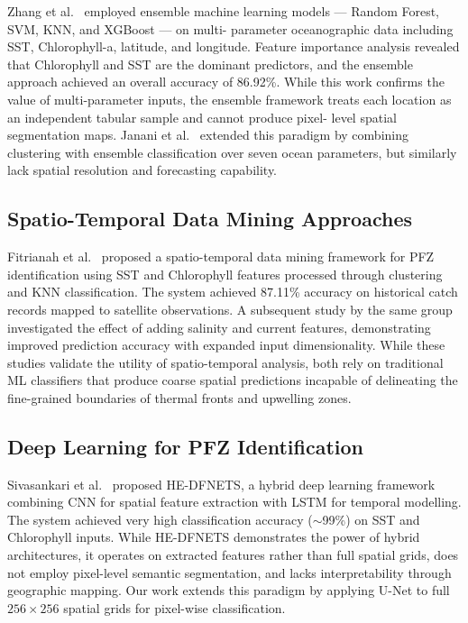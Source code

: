 \documentclass[conference]{IEEEtran}
\begin{document}
Zhang et al.\ \cite{zhang_ensemble2023} employed ensemble machine
learning models --- Random Forest, SVM, KNN, and XGBoost --- on multi-
parameter oceanographic data including SST, Chlorophyll-a, latitude,
and longitude. Feature importance analysis revealed that Chlorophyll
and SST are the dominant predictors, and the ensemble approach
achieved an overall accuracy of 86.92\%. While this work confirms the
value of multi-parameter inputs, the ensemble framework treats each
location as an independent tabular sample and cannot produce pixel-
level spatial segmentation maps. Janani et al.\ \cite{janani2025}
extended this paradigm by combining clustering with ensemble
classification over seven ocean parameters, but similarly lack spatial
resolution and forecasting capability.

\subsection{Spatio-Temporal Data Mining Approaches}

Fitrianah et al.\ \cite{fitrianah2015} proposed a spatio-temporal data
mining framework for PFZ identification using SST and Chlorophyll
features processed through clustering and KNN classification. The
system achieved 87.11\% accuracy on historical catch records mapped to
satellite observations. A subsequent study by the same group
\cite{fitrianah_feature2016} investigated the effect of adding
salinity and current features, demonstrating improved prediction
accuracy with expanded input dimensionality. While these studies
validate the utility of spatio-temporal analysis, both rely on
traditional ML classifiers that produce coarse spatial predictions
incapable of delineating the fine-grained boundaries of thermal fronts
and upwelling zones.

\subsection{Deep Learning for PFZ Identification}

Sivasankari et al.\ \cite{sivasankari2022} proposed HE-DFNETS, a
hybrid deep learning framework combining CNN for spatial feature
extraction with LSTM for temporal modelling. The system achieved very
high classification accuracy ($\sim$99\%) on SST and Chlorophyll
inputs. While HE-DFNETS demonstrates the power of hybrid
architectures, it operates on extracted features rather than full
spatial grids, does not employ pixel-level semantic segmentation, and
lacks interpretability through geographic mapping. Our work extends
this paradigm by applying U-Net to full $256 \times 256$ spatial
grids for pixel-wise classification.
\end{document}
